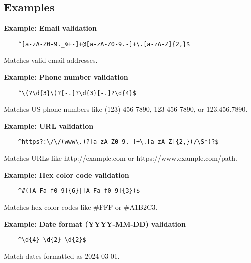 \subsection{Examples}

\textbf{Example: Email validation}

\begin{verbatim}
    ^[a-zA-Z0-9._%+-]+@[a-zA-Z0-9.-]+\.[a-zA-Z]{2,}$
\end{verbatim}

Matches valid email addresses.

\textbf{Example: Phone number validation}

\begin{verbatim}
    ^\(?\d{3}\)?[-.]?\d{3}[-.]?\d{4}$
\end{verbatim}

Matches US phone numbers like (123) 456-7890, 123-456-7890, or 123.456.7890.

\textbf{Example: URL validation}

\begin{verbatim}
    ^https?:\/\/(www\.)?[a-zA-Z0-9.-]+\.[a-zA-Z]{2,}(/\S*)?$
\end{verbatim}

Matches URLs like http://example.com or https://www.example.com/path.

\textbf{Example: Hex color code validation}

\begin{verbatim}
    ^#([A-Fa-f0-9]{6}|[A-Fa-f0-9]{3})$
\end{verbatim}

Matches hex color codes like \#FFF or \#A1B2C3.

\textbf{Example: Date format (YYYY-MM-DD) validation}

\begin{verbatim}
    ^\d{4}-\d{2}-\d{2}$
\end{verbatim}

Match dates formatted as 2024-03-01.
